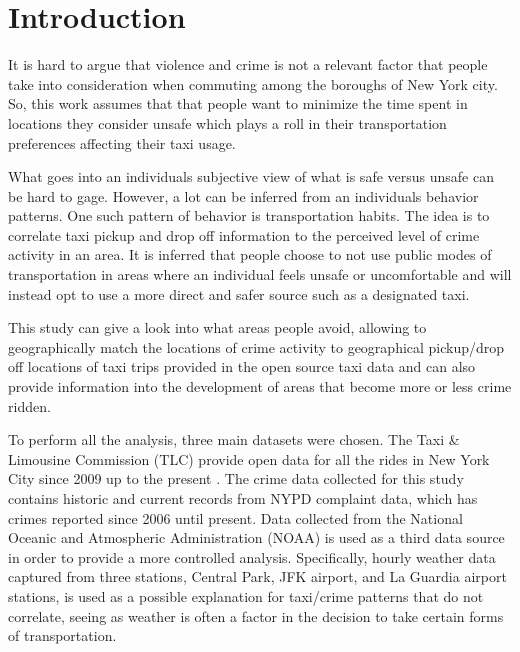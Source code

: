 \documentclass{sigkddExp}
\begin{document}
\section{Introduction}

It is hard to argue that violence and crime is not a relevant factor that people take into consideration when commuting among the boroughs of New York city. 
So, this work assumes that that people want to minimize the time spent in locations they consider unsafe which  plays a roll in their transportation preferences affecting their taxi usage. 

What goes into an individuals subjective view of what is safe versus unsafe can be hard to gage. However, a lot can be inferred from an individuals behavior patterns.
One such pattern of behavior is transportation habits. The idea is to correlate taxi pickup and drop off information to the perceived level of crime activity in an area. 
It is inferred that people choose to not use public modes of transportation in areas where an individual feels unsafe or uncomfortable and will instead opt to use a more direct and safer source such as a designated taxi. 




This study can give a look into what areas people avoid, allowing to geographically match the locations of crime activity to geographical pickup/drop off locations of taxi trips provided in the open source taxi data and can also provide information into the development of areas that become more or less crime ridden. 

To perform all the analysis, three main datasets were chosen.
The Taxi \& Limousine Commission (TLC) provide open data for all the rides in New York City since 2009 up to the present \cite{Taxi}. 
The crime data collected for this study contains historic \cite{NYPDHis} and current \cite{NYPDCur} records from NYPD complaint data, which has crimes reported since 2006 until present.
Data collected from the National Oceanic and Atmospheric Administration (NOAA) \cite{NOAA} is used as a third data source in order to provide a more controlled analysis. Specifically, hourly weather data  captured from three stations, Central Park, JFK airport, and La Guardia airport stations, is used as a possible explanation for taxi/crime patterns that do not correlate, seeing as weather is often a factor in the decision to take certain forms of transportation.
\end{document}
